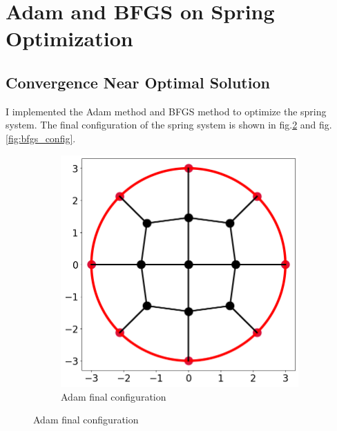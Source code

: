 \documentclass[12pt]{article}
\newcommand{\0}{\boldsymbol{0}}
\begin{document}
\section{Adam and BFGS on Spring Optimization}

\subsection{Convergence Near Optimal Solution}



I implemented the Adam method and BFGS method to optimize the spring system. The final configuration of the spring system is shown in fig.\ref{fig:adam_config} and fig.\ref{fig:bfgs_config}.
\begin{figure}[h!]
    \centering
    \begin{subfigure}[b]{0.45\textwidth}
        \centering
        \includegraphics[width=\textwidth]{../img/problem_2/adam.png}
        \caption{Adam final configuration}
        \label{fig:adam_config}
        

\end{subfigure}
\end{figure}
\end{document}
